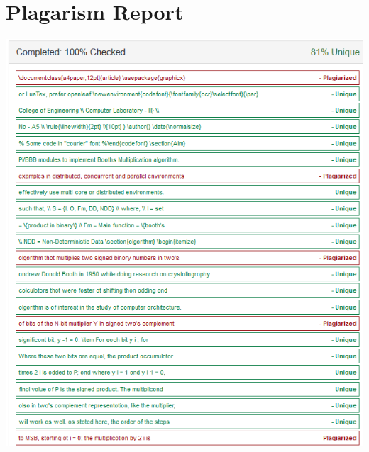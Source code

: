 \documentclass[a4paper,12pt]{article}
\begin{document}
\section{Plagarism Report}
	 \includegraphics[width=\textwidth]{clusterbooths_plaga}
\end{document}
